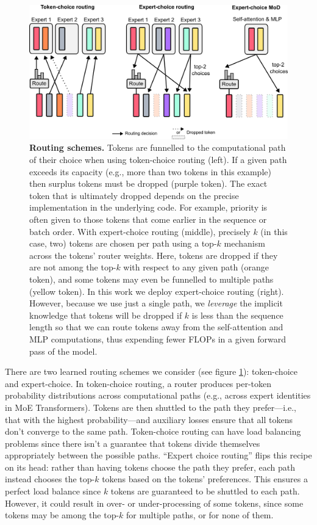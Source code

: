 \documentclass[11pt, a4paper, onecolumn, logo, copyright]{googledeepmind}
\begin{document}
\begin{figure}[h]
    \centering
    \includegraphics{routing.png}
    \caption{\textbf{Routing schemes.} Tokens are funnelled to the computational path of their choice when using token-choice routing (left). If a given path exceeds its capacity (e.g., more than two tokens in this example) then surplus tokens must be dropped (purple token). The exact token that is ultimately dropped depends on the  precise implementation in the underlying code. For example, priority is often given to those tokens that come earlier in the sequence or batch order. With expert-choice routing (middle), precisely $k$ (in this case, two) tokens are chosen per path using a top-$k$ mechanism across the tokens' router weights. Here, tokens are dropped if they are not among the top-$k$ with respect to any given path (orange token), and some tokens may even be funnelled to multiple paths (yellow token). In this work we deploy expert-choice routing (right). However, because we use just a single path, we \emph{leverage} the implicit knowledge that tokens will be dropped if $k$ is less than the sequence length so that we can route tokens away from the self-attention and MLP computations, thus expending fewer FLOPs in a given forward pass of the model.}
    \label{fig:routing}
\end{figure}

There are two learned routing schemes we consider (see figure \ref{fig:routing}): token-choice and expert-choice. In token-choice routing, a router produces per-token probability distributions across computational paths (e.g., across expert identities in MoE Transformers). Tokens are then shuttled to the path they prefer---i.e., that with the highest probability---and auxiliary losses ensure that all tokens don't converge to the same path. Token-choice routing can have load balancing problems since there isn't a guarantee that tokens divide themselves appropriately between the possible paths. ``Expert choice routing'' flips this recipe on its head: rather than having tokens choose the path they prefer, each path instead chooses the top-$k$ tokens based on the tokens' preferences. This ensures a perfect load balance since $k$ tokens are guaranteed to be shuttled to each path. However, it could result in over- or under-processing of some tokens, since some tokens may be among the top-$k$ for multiple paths, or for none of them.
\end{document}
